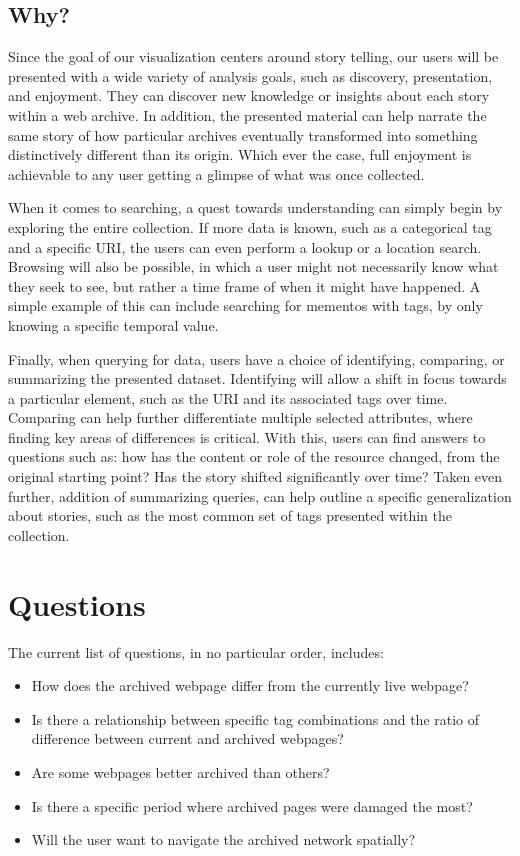 \documentclass[12pt]{article}
\begin{document}
\subsection*{Why?}
Since the goal of our visualization centers around story telling, our users will be presented with a wide variety of analysis goals, such as discovery, presentation, and enjoyment. They can discover new knowledge or insights about each story within a web archive. In addition, the presented material can help narrate the same story of how particular archives eventually transformed into something distinctively different than its origin. Which ever the case, full enjoyment is achievable to any user getting a glimpse of what was once collected.

When it comes to searching, a quest towards understanding can simply begin by exploring the entire collection. If more data is known, such as a categorical tag and a specific URI, the users can even perform a lookup or a location search. Browsing will also be possible, in which a user might not necessarily know what they seek to see, but rather a time frame of when it might have happened. A simple example of this can include searching for mementos with tags, by only knowing a specific temporal value.

Finally, when querying for data, users have a choice of identifying, comparing, or summarizing the presented dataset. Identifying will allow a shift in focus towards a particular element, such as the URI and its associated tags over time. Comparing can help further differentiate multiple selected attributes, where finding key areas of differences is critical. With this, users can find answers to questions such as:  how has the content or role of the resource changed, from the original starting point? Has the story shifted significantly over time? Taken even further, addition of summarizing queries, can help outline a specific generalization about stories, such as the most common set of tags presented within the collection.



\section*{Questions}
The current list of questions, in no particular order, includes:

\begin{itemize}
  \item How does the archived webpage differ from the currently live webpage?
  \item Is there a relationship between specific tag combinations and the ratio of difference between current and archived webpages?
  \item Are some webpages better archived than others?
  \item Is there a specific period where archived pages were damaged the most?
  \item Will the user want to navigate the archived network spatially?
\end{itemize}

\clearpage
\end{document}
